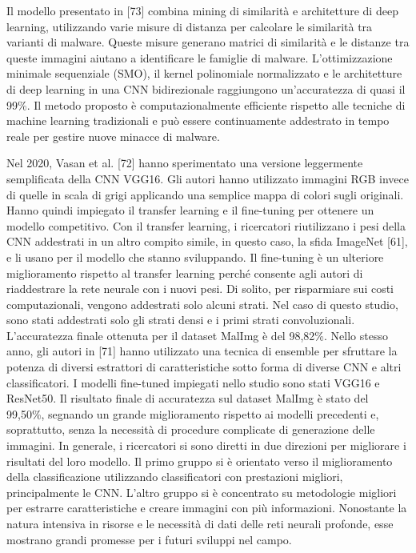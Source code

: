 Il modello presentato in [73] combina mining di similarità e architetture di deep learning, utilizzando varie misure di distanza per calcolare le similarità tra varianti di malware. Queste misure generano matrici di similarità e le distanze tra queste immagini aiutano a identificare le famiglie di malware. L'ottimizzazione minimale sequenziale (SMO), il kernel polinomiale normalizzato e le architetture di deep learning in una CNN bidirezionale raggiungono un'accuratezza di quasi il 99\%. Il metodo proposto è computazionalmente efficiente rispetto alle tecniche di machine learning tradizionali e può essere continuamente addestrato in tempo reale per gestire nuove minacce di malware.

Nel 2020, Vasan et al. [72] hanno sperimentato una versione leggermente semplificata della CNN VGG16. Gli autori hanno utilizzato immagini RGB invece di quelle in scala di grigi applicando una semplice mappa di colori sugli originali. Hanno quindi impiegato il transfer learning e il fine-tuning per ottenere un modello competitivo. Con il transfer learning, i ricercatori riutilizzano i pesi della CNN addestrati in un altro compito simile, in questo caso, la sfida ImageNet [61], e li usano per il modello che stanno sviluppando. Il fine-tuning è un ulteriore miglioramento rispetto al transfer learning perché consente agli autori di riaddestrare la rete neurale con i nuovi pesi. Di solito, per risparmiare sui costi computazionali, vengono addestrati solo alcuni strati. Nel caso di questo studio, sono stati addestrati solo gli strati densi e i primi strati convoluzionali. L'accuratezza finale ottenuta per il dataset MalImg è del 98,82\%. Nello stesso anno, gli autori in [71] hanno utilizzato una tecnica di ensemble per sfruttare la potenza di diversi estrattori di caratteristiche sotto forma di diverse CNN e altri classificatori. I modelli fine-tuned impiegati nello studio sono stati VGG16 e ResNet50. Il risultato finale di accuratezza sul dataset MalImg è stato del 99,50\%, segnando un grande miglioramento rispetto ai modelli precedenti e, soprattutto, senza la necessità di procedure complicate di generazione delle immagini. In generale, i ricercatori si sono diretti in due direzioni per migliorare i risultati del loro modello. Il primo gruppo si è orientato verso il miglioramento della classificazione utilizzando classificatori con prestazioni migliori, principalmente le CNN. L'altro gruppo si è concentrato su metodologie migliori per estrarre caratteristiche e creare immagini con più informazioni. Nonostante la natura intensiva in risorse e le necessità di dati delle reti neurali profonde, esse mostrano grandi promesse per i futuri sviluppi nel campo.

